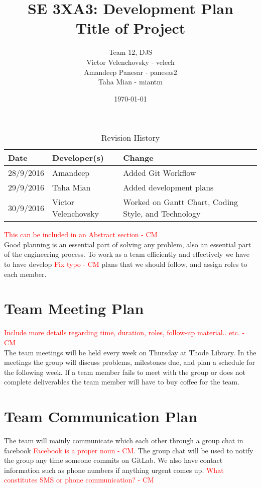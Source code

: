 \documentclass{article}
\title{SE 3XA3: Development Plan\\Title of Project}
\author{Team 12, DJS
		\\ Victor Velenchovsky - velech
		\\ Amandeep Panesar - panesas2
		\\ Taha Mian - miantm
}
\date{\today}
\begin{document}
\begin{table}[hp]
\caption{Revision History} \label{TblRevisionHistory}
\begin{tabularx}{\textwidth}{llX}
\toprule
\textbf{Date} & \textbf{Developer(s)} & \textbf{Change}\\
\midrule
28/9/2016 & Amandeep & Added Git Workflow\\
29/9/2016 & Taha Mian & Added development plans\\
30/9/2016 & Victor Velenchovsky  & Worked on Gantt Chart, Coding Style, and Technology \\
\bottomrule
\end{tabularx}
\end{table}

\newpage

\maketitle
\textcolor{red}{ This can be included in an Abstract section - CM} \\
Good planning is an essential part of solving any problem, also an essential part of the engineering process. To work as a team efficiently and effectively we have to have develop \textcolor{red}{ Fix typo - CM} plans that we should follow, and assign roles to each member.

\section{Team Meeting Plan}
\textcolor{red}{Include more details regarding time, duration, roles, follow-up material.. etc. - CM} \\
The team meetings will be held every week on Thursday at Thode Library. In the meetings the group will discuss problems, milestones due, and plan a schedule for the following week. If a team member fails to meet with the group or does not complete deliverables the team member will have to buy coffee for the team.
\section{Team Communication Plan}
The team will mainly communicate which each other through a group chat in facebook \textcolor{red}{ Facebook is a proper noun - CM}. The group chat will be used to notify the group any time someone commits on GitLab. We also have contact information such as phone numbers if anything urgent comes up. \textcolor{red}{What constitutes SMS or phone communication?  - CM} 
\end{document}
